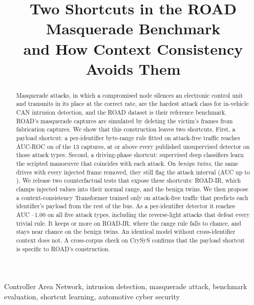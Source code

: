\documentclass[conference]{IEEEtran}
\begin{document}
\title{Two Shortcuts in the ROAD Masquerade Benchmark\\and How Context Consistency Avoids Them}

\author{
}

\maketitle

\begin{abstract}
Masquerade attacks, in which a compromised node silences an electronic control unit and transmits in its place at the correct rate, are the hardest attack class for in-vehicle CAN intrusion detection, and the ROAD dataset is their reference benchmark. ROAD's masquerade captures are simulated by deleting the victim's frames from fabrication captures. We show that this construction leaves two shortcuts. First, a payload shortcut: a per-identifier byte-range rule fitted on attack-free traffic reaches AUC-ROC \ExtAUCmin{} on \NExtCaps{} of the 13 captures, at or above every published unsupervised detector on those attack types. Second, a driving-phase shortcut: supervised deep classifiers learn the scripted manoeuvre that coincides with each attack. On \emph{benign twins}, the same drives with every injected frame removed, they still flag the attack interval (AUC up to \SupTwinMax). We release two counterfactual tests that expose these shortcuts: ROAD-IR, which clamps injected values into their normal range, and the benign twins. We then propose a context-consistency Transformer trained only on attack-free traffic that predicts each identifier's payload from the rest of the bus. As a per-identifier detector it reaches AUC \CtxRoadMin--1.00 on all five attack types, including the reverse-light attacks that defeat every trivial rule. It keeps \CtxIRMin{} or more on ROAD-IR, where the range rule falls to chance, and stays near chance on the benign twins. An identical model without cross-identifier context does not. A cross-corpus check on CrySyS confirms that the payload shortcut is specific to ROAD's construction.
\end{abstract}

\begin{IEEEkeywords}
Controller Area Network, intrusion detection, masquerade attack, benchmark evaluation, shortcut learning, automotive cyber security
\end{IEEEkeywords}
\end{document}
